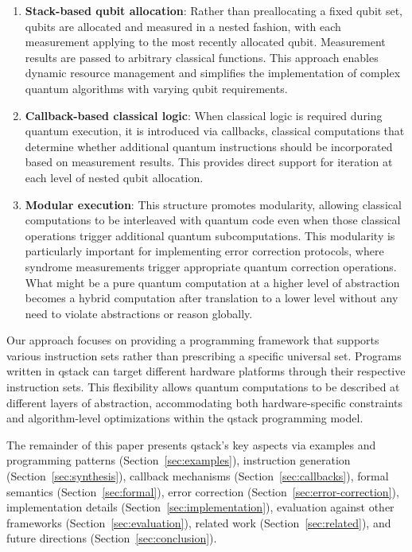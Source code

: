\begin{enumerate}
\item \textbf{Stack-based qubit allocation}: Rather than preallocating a fixed qubit set, qubits are allocated and measured in a nested fashion, with each measurement applying to the most recently allocated qubit. Measurement results are passed to arbitrary classical functions. This approach enables dynamic resource management and simplifies the implementation of complex quantum algorithms with varying qubit requirements.

\item \textbf{Callback-based classical logic}: When classical logic is required during quantum execution, it is introduced via callbacks, classical computations that determine whether additional quantum instructions should be incorporated based on measurement results. This provides direct support for iteration at each level of nested qubit allocation.

\item \textbf{Modular execution}: This structure promotes modularity, allowing classical computations to be interleaved with quantum code even when those classical operations trigger additional quantum subcomputations. This modularity is particularly important for implementing error correction protocols, where syndrome measurements trigger appropriate quantum correction operations. What might be a pure quantum computation at a higher level of abstraction becomes a hybrid computation after translation to a lower level without any need to violate abstractions or reason globally.
\end{enumerate}

Our approach focuses on providing a programming framework that supports various instruction sets rather than prescribing a specific universal set. Programs written in qstack can target different hardware platforms through their respective instruction sets. This flexibility allows quantum computations to be described at different layers of abstraction, accommodating both hardware-specific constraints and algorithm-level optimizations within the qstack programming model. 

The remainder of this paper presents qstack's key aspects via examples and programming patterns (Section~\ref{sec:examples}), instruction generation (Section~\ref{sec:synthesis}), callback mechanisms (Section~\ref{sec:callbacks}), formal semantics (Section~\ref{sec:formal}), error correction (Section~\ref{sec:error-correction}), implementation details (Section~\ref{sec:implementation}), evaluation against other frameworks (Section~\ref{sec:evaluation}), related work (Section~\ref{sec:related}), and future directions (Section~\ref{sec:conclusion}).
